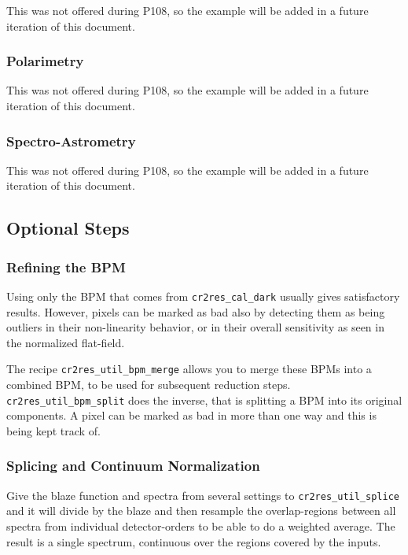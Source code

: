 This was not offered during P108, so the example will be added in a
future iteration of this document.

\subsubsection{Polarimetry}

This was not offered during P108, so the example will be added in a
future iteration of this document.

\subsubsection{Spectro-Astrometry}

This was not offered during P108, so the example will be added in a
future iteration of this document.


\subsection{Optional Steps}

\subsubsection{Refining the BPM}

Using only the BPM that comes from \texttt{cr2res\_cal\_dark} usually gives
satisfactory results. However, pixels can be marked as bad also by detecting
them as being outliers in their non-linearity behavior, or in their overall
sensitivity as seen in the normalized flat-field.

The recipe \texttt{cr2res\_util\_bpm\_merge} allows you to merge these BPMs into
a combined BPM, to be used for subsequent reduction steps.
\texttt{cr2res\_util\_bpm\_split} does the inverse, that is splitting a BPM into
its original components. A pixel can be marked as bad in more than one way and
this is being kept track of.

\subsubsection{Splicing and Continuum Normalization}

Give the blaze function and spectra from several settings to
\texttt{cr2res\_util\_splice} and it will divide by the blaze and then resample
the overlap-regions between all spectra from individual detector-orders to be
able to do a weighted average. The result is a single spectrum, continuous over
the regions covered by the inputs.

